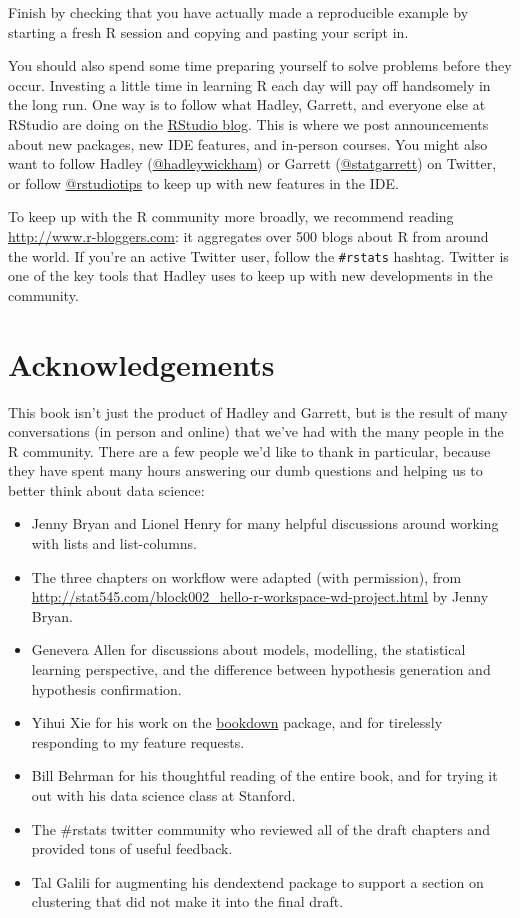\documentclass[]{book}
\begin{document}
Finish by checking that you have actually made a reproducible example by
starting a fresh R session and copying and pasting your script in.

You should also spend some time preparing yourself to solve problems
before they occur. Investing a little time in learning R each day will
pay off handsomely in the long run. One way is to follow what Hadley,
Garrett, and everyone else at RStudio are doing on the
\href{https://blog.rstudio.org}{RStudio blog}. This is where we post
announcements about new packages, new IDE features, and in-person
courses. You might also want to follow Hadley
(\href{https://twitter.com/hadleywickham}{@hadleywickham}) or Garrett
(\href{https://twitter.com/statgarrett}{@statgarrett}) on Twitter, or
follow \href{https://twitter.com/rstudiotips}{@rstudiotips} to keep up
with new features in the IDE.

To keep up with the R community more broadly, we recommend reading
\url{http://www.r-bloggers.com}: it aggregates over 500 blogs about R
from around the world. If you're an active Twitter user, follow the
\texttt{\#rstats} hashtag. Twitter is one of the key tools that Hadley
uses to keep up with new developments in the community.

\section{Acknowledgements}\label{acknowledgements}

This book isn't just the product of Hadley and Garrett, but is the
result of many conversations (in person and online) that we've had with
the many people in the R community. There are a few people we'd like to
thank in particular, because they have spent many hours answering our
dumb questions and helping us to better think about data science:

\begin{itemize}
\item
  Jenny Bryan and Lionel Henry for many helpful discussions around
  working with lists and list-columns.
\item
  The three chapters on workflow were adapted (with permission), from
  \url{http://stat545.com/block002_hello-r-workspace-wd-project.html} by
  Jenny Bryan.
\item
  Genevera Allen for discussions about models, modelling, the
  statistical learning perspective, and the difference between
  hypothesis generation and hypothesis confirmation.
\item
  Yihui Xie for his work on the
  \href{https://github.com/rstudio/bookdown}{bookdown} package, and for
  tirelessly responding to my feature requests.
\item
  Bill Behrman for his thoughtful reading of the entire book, and for
  trying it out with his data science class at Stanford.
\item
  The \#rstats twitter community who reviewed all of the draft chapters
  and provided tons of useful feedback.
\item
  Tal Galili for augmenting his dendextend package to support a section
  on clustering that did not make it into the final draft.
\end{itemize}
\end{document}
